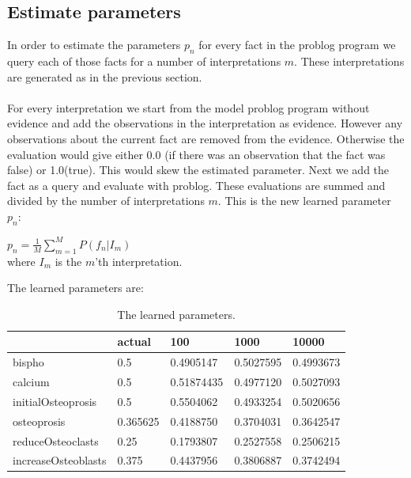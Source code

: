\documentclass{article}
\begin{document}
\subsection{Estimate parameters}
In order to estimate the parameters $p_{n}$ for every fact in the problog program we query each of those facts for a number of interpretations $m$. These interpretations are generated as in the previous section.\\\\
For every interpretation we start from the model problog program without evidence and add the observations in the interpretation as evidence. However any observations about the current fact are removed from the evidence. Otherwise the evaluation would give either 0.0 (if there was an observation that the fact was false) or 1.0(true). This would skew the estimated parameter. Next we add the fact as a query and evaluate with problog. These evaluations are summed and divided by the number of interpretations $m$. This is the new learned parameter $p_{n}$:
\begin{center}
    $p_{n} = \frac{1}{M} \sum_{m=1}^M P(f_{n}|I_{m}) $\\
    where $I_{m}$ is the $m$'th interpretation.
\end{center}
The learned parameters are:
\begin{table}[h!]
    \begin{center}
    \begin{tabular}{|l|l|l|l|l|}
    \hline
                    & actual   & 100        & 1000      & 10000     \\ \hline
    bispho              & 0.5      & 0.4905147  & 0.5027595 & 0.4993673 \\ \hline
    calcium             & 0.5      & 0.51874435 & 0.4977120 & 0.5027093 \\ \hline
    initialOsteoprosis  & 0.5      & 0.5504062  & 0.4933254 & 0.5020656 \\ \hline
    osteoprosis         & 0.365625 & 0.4188750  & 0.3704031 & 0.3642547 \\ \hline
    reduceOsteoclasts   & 0.25     & 0.1793807  & 0.2527558 & 0.2506215 \\ \hline
    increaseOsteoblasts & 0.375    & 0.4437956  & 0.3806887 & 0.3742494          \\ \hline
    \end{tabular}
    \caption{The learned parameters.}
    \label{tab:param}
    \end{center}
\end{table}
\end{document}
